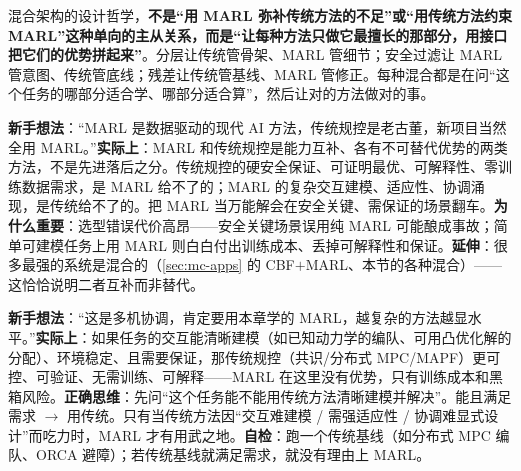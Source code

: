 \begin{insight}
混合架构的设计哲学，\textbf{不是“用 MARL 弥补传统方法的不足”或“用传统方法约束 MARL”这种单向的主从关系，而是“让每种方法只做它最擅长的那部分，用接口把它们的优势拼起来”}。分层让传统管骨架、MARL 管细节；安全过滤让 MARL 管意图、传统管底线；残差让传统管基线、MARL 管修正。每种混合都是在问“这个任务的哪部分适合学、哪部分适合算”，然后让对的方法做对的事。
\end{insight}

\begin{pitfall}
\textbf{新手想法}：“MARL 是数据驱动的现代 AI 方法，传统规控是老古董，新项目当然全用 MARL。”\textbf{实际上}：MARL 和传统规控是能力互补、各有不可替代优势的两类方法，不是先进落后之分。传统规控的硬安全保证、可证明最优、可解释性、零训练数据需求，是 MARL 给不了的；MARL 的复杂交互建模、适应性、协调涌现，是传统给不了的。把 MARL 当万能解会在安全关键、需保证的场景翻车。\textbf{为什么重要}：选型错误代价高昂——安全关键场景误用纯 MARL 可能酿成事故；简单可建模任务上用 MARL 则白白付出训练成本、丢掉可解释性和保证。\textbf{延伸}：很多最强的系统是混合的（\cref{sec:mc-apps} 的 CBF$+$MARL、本节的各种混合）——这恰恰说明二者互补而非替代。
\end{pitfall}

\begin{pitfall}
\textbf{新手想法}：“这是多机协调，肯定要用本章学的 MARL，越复杂的方法越显水平。”\textbf{实际上}：如果任务的交互能清晰建模（如已知动力学的编队、可用凸优化解的分配）、环境稳定、且需要保证，那传统规控（共识/分布式 MPC/MAPF）更可控、可验证、无需训练、可解释——MARL 在这里没有优势，只有训练成本和黑箱风险。\textbf{正确思维}：先问“这个任务能不能用传统方法清晰建模并解决”。能且满足需求 $\to$ 用传统。只有当传统方法因“交互难建模 / 需强适应性 / 协调难显式设计”而吃力时，MARL 才有用武之地。\textbf{自检}：跑一个传统基线（如分布式 MPC 编队、ORCA 避障）；若传统基线就满足需求，就没有理由上 MARL。
\end{pitfall}

